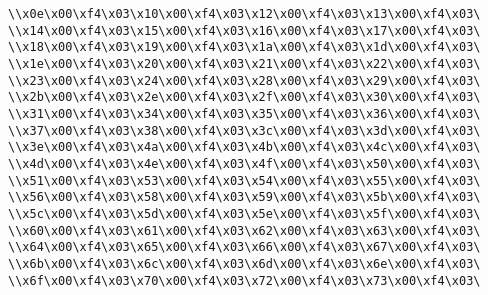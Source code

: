 \verb|\\x0e\x00\xf4\x03\x10\x00\xf4\x03\x12\x00\xf4\x03\x13\x00\xf4\x03\|\newline
\verb|\\x14\x00\xf4\x03\x15\x00\xf4\x03\x16\x00\xf4\x03\x17\x00\xf4\x03\|\newline
\verb|\\x18\x00\xf4\x03\x19\x00\xf4\x03\x1a\x00\xf4\x03\x1d\x00\xf4\x03\|\newline
\verb|\\x1e\x00\xf4\x03\x20\x00\xf4\x03\x21\x00\xf4\x03\x22\x00\xf4\x03\|\newline
\verb|\\x23\x00\xf4\x03\x24\x00\xf4\x03\x28\x00\xf4\x03\x29\x00\xf4\x03\|\newline
\verb|\\x2b\x00\xf4\x03\x2e\x00\xf4\x03\x2f\x00\xf4\x03\x30\x00\xf4\x03\|\newline
\verb|\\x31\x00\xf4\x03\x34\x00\xf4\x03\x35\x00\xf4\x03\x36\x00\xf4\x03\|\newline
\verb|\\x37\x00\xf4\x03\x38\x00\xf4\x03\x3c\x00\xf4\x03\x3d\x00\xf4\x03\|\newline
\verb|\\x3e\x00\xf4\x03\x4a\x00\xf4\x03\x4b\x00\xf4\x03\x4c\x00\xf4\x03\|\newline
\verb|\\x4d\x00\xf4\x03\x4e\x00\xf4\x03\x4f\x00\xf4\x03\x50\x00\xf4\x03\|\newline
\verb|\\x51\x00\xf4\x03\x53\x00\xf4\x03\x54\x00\xf4\x03\x55\x00\xf4\x03\|\newline
\verb|\\x56\x00\xf4\x03\x58\x00\xf4\x03\x59\x00\xf4\x03\x5b\x00\xf4\x03\|\newline
\verb|\\x5c\x00\xf4\x03\x5d\x00\xf4\x03\x5e\x00\xf4\x03\x5f\x00\xf4\x03\|\newline
\verb|\\x60\x00\xf4\x03\x61\x00\xf4\x03\x62\x00\xf4\x03\x63\x00\xf4\x03\|\newline
\verb|\\x64\x00\xf4\x03\x65\x00\xf4\x03\x66\x00\xf4\x03\x67\x00\xf4\x03\|\newline
\verb|\\x6b\x00\xf4\x03\x6c\x00\xf4\x03\x6d\x00\xf4\x03\x6e\x00\xf4\x03\|\newline
\verb|\\x6f\x00\xf4\x03\x70\x00\xf4\x03\x72\x00\xf4\x03\x73\x00\xf4\x03\|\newline
